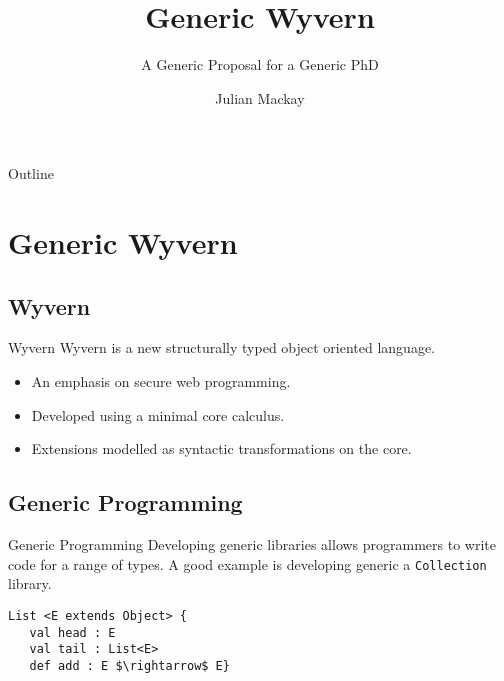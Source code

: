 \documentclass[dvipsnames]{beamer}
\title{Generic Wyvern}
\subtitle{A Generic Proposal for a Generic PhD}
\author{Julian Mackay}
\institute[VUW] %
{
  School of Engineering and Computer Science\\
  Victoria University of Wellington
  }
\date{}
\begin{document}
\begin{frame}
  \titlepage
\end{frame}

\begin{frame}{Outline}
  \tableofcontents[pausesections]
\end{frame}

\section{Generic Wyvern}

\subsection{Wyvern}

\begin{frame}{Wyvern}
Wyvern is a new structurally typed object oriented language.
\begin{itemize}
\item
An emphasis on secure web programming.
\item
Developed using a minimal core calculus.
\item
Extensions modelled as syntactic transformations on the core.
\end{itemize}
\end{frame}

\subsection{Generic Programming}


\begin{frame}{Generic Programming}
Developing generic libraries allows programmers to write code for a range of types. A good example is developing generic a \texttt{Collection} library.
\end{frame}

\begin{lrbox}{\tpExList}
\begin{lstlisting}[mathescape, style=customlang]
List <E extends Object> {
   val head : E
   val tail : List<E>
   def add : E $\rightarrow$ E}
\end{lstlisting}
\end{lrbox}
\end{document}
